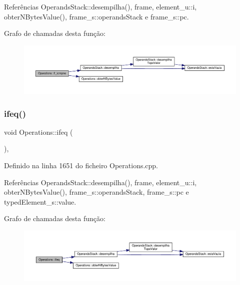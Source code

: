 Referências Operands\+Stack\+::desempilha(), frame, element\+\_\+u\+::i, obter\+N\+Bytes\+Value(), frame\+\_\+s\+::operands\+Stack e frame\+\_\+s\+::pc.

Grafo de chamadas desta função\+:\nopagebreak
\begin{figure}[H]
\begin{center}
\leavevmode
\includegraphics[width=350pt]{classOperations_a52dca630766e37bbaf0e7439c0335273_cgraph}
\end{center}
\end{figure}
\mbox{\label{classOperations_ad33c8bdb5f67bdbf0885bb51990f99ee}} 
\subsubsection{\texorpdfstring{ifeq()}{ifeq()}}
{\footnotesize\ttfamily void Operations\+::ifeq (\begin{DoxyParamCaption}{ }\end{DoxyParamCaption})\hspace{0.3cm}{\ttfamily [static]}, {\ttfamily [private]}}



Definido na linha 1651 do ficheiro Operations.\+cpp.



Referências Operands\+Stack\+::desempilha(), frame, element\+\_\+u\+::i, obter\+N\+Bytes\+Value(), frame\+\_\+s\+::operands\+Stack, frame\+\_\+s\+::pc e typed\+Element\+\_\+s\+::value.

Grafo de chamadas desta função\+:\nopagebreak
\begin{figure}[H]
\begin{center}
\leavevmode
\includegraphics[width=350pt]{classOperations_ad33c8bdb5f67bdbf0885bb51990f99ee_cgraph}
\end{center}
\end{figure}
\mbox{\label{classOperations_a0e7cf2111ad25ee52aa329cc6ec4d38a}} 

